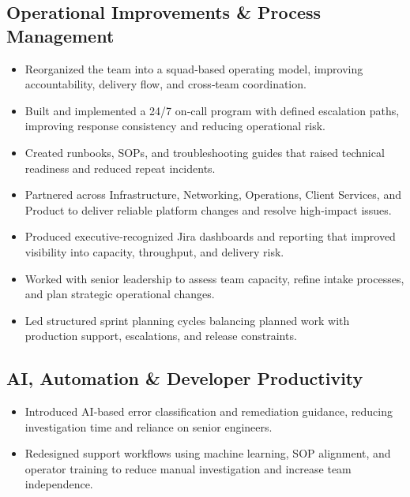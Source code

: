 \documentclass[12pt,letter]{article}
\begin{document}
\subsection*{Operational Improvements \& Process Management}
\begin{itemize}[noitemsep]
\item Reorganized the team into a squad‑based operating model, improving accountability, delivery flow, and cross‑team coordination.
\item Built and implemented a 24/7 on‑call program with defined escalation paths, improving response consistency and reducing operational risk.
\item Created runbooks, SOPs, and troubleshooting guides that raised technical readiness and reduced repeat incidents.
\item Partnered across Infrastructure, Networking, Operations, Client Services, and Product to deliver reliable platform changes and resolve high‑impact issues.
\item Produced executive‑recognized Jira dashboards and reporting that improved visibility into capacity, throughput, and delivery risk.
\item Worked with senior leadership to assess team capacity, refine intake processes, and plan strategic operational changes.
\item Led structured sprint planning cycles balancing planned work with production support, escalations, and release constraints.
\end{itemize}
\subsection*{AI, Automation \& Developer Productivity}
\begin{itemize}[noitemsep]
\item Introduced AI‑based error classification and remediation guidance, reducing investigation time and reliance on senior engineers.
\item Redesigned support workflows using machine learning, SOP alignment, and operator training to reduce manual investigation and increase team independence.
\end{itemize}
\end{document}
